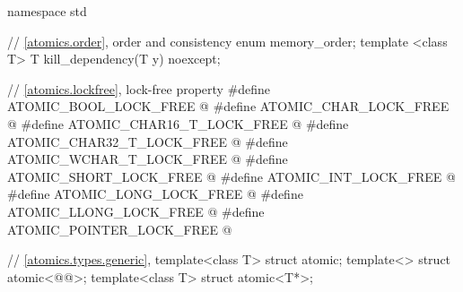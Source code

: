 %
%
\begin{codeblock}
namespace std {
  // \ref{atomics.order}, order and consistency
  enum memory_order;
  template <class T>
    T kill_dependency(T y) noexcept;

  // \ref{atomics.lockfree}, lock-free property
  #define ATOMIC_BOOL_LOCK_FREE @\unspec@
  #define ATOMIC_CHAR_LOCK_FREE @\unspec@
  #define ATOMIC_CHAR16_T_LOCK_FREE @\unspec@
  #define ATOMIC_CHAR32_T_LOCK_FREE @\unspec@
  #define ATOMIC_WCHAR_T_LOCK_FREE @\unspec@
  #define ATOMIC_SHORT_LOCK_FREE @\unspec@
  #define ATOMIC_INT_LOCK_FREE @\unspec@
  #define ATOMIC_LONG_LOCK_FREE @\unspec@
  #define ATOMIC_LLONG_LOCK_FREE @\unspec@
  #define ATOMIC_POINTER_LOCK_FREE @\unspec@

  // \ref{atomics.types.generic},  
  template<class T> struct atomic;
  template<> struct atomic<@@>;
  template<class T> struct atomic<T*>;

}
\end{codeblock}

